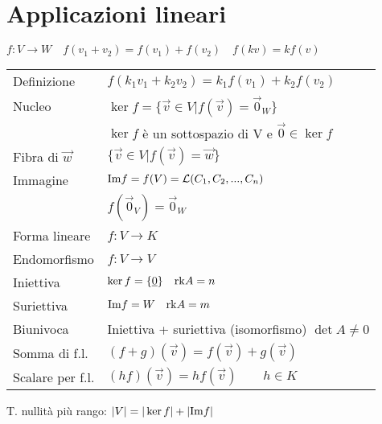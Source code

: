 \section{Applicazioni lineari}
$f: V \rightarrow W \quad f(v_1+v_2) = f(v_1) + f(v_2) \quad f(kv) = kf(v)$

\begin{tabular}{l@{\quad}l}
	Definizione & $f(k_1v_1 + k_2v_2) = k_1f(v_1) + k_2f(v_2)$ \\
	Nucleo & $\ker f = \{ \vec{v} \in V | f(\vec{v}) = \vec{0}_{W} \}$ \\
		   & $\ker f$ è un sottospazio di V e $\vec{0} \in \ker f$ \\
	Fibra di $\vec{w}$ & $\{ \vec{v} \in V | f(\vec{v}) = \vec{w} \}$ \\
	Immagine & $\mathrm{Im} f = f(V) = \mathcal{L}(C_1, C_2, ..., C_n)$ \\
			 & $f(\vec{0}_V) = \vec{0}_W$ \\
	Forma lineare & $f: V \rightarrow K$ \\
	Endomorfismo & $f: V \rightarrow V$ \\
	Iniettiva & $\ker f = \{\underline{0}\} \quad \mathrm{rk} A = n$ \\
	Suriettiva & $\mathrm{Im} f = W \quad \mathrm{rk} A = m$ \\
	Biunivoca & Iniettiva + suriettiva (isomorfismo) $\det A \ne 0$ \\
	Somma di f.l. & $(f+g)(\vec{v}) = f(\vec{v}) + g(\vec{v})$ \\
	Scalare per f.l. & $(hf)(\vec{v}) = hf(\vec{v}) \qquad h \in K$ \\
\end{tabular}

T. nullità più rango: $|V| = |\ker f| + |\mathrm{Im} f|$
